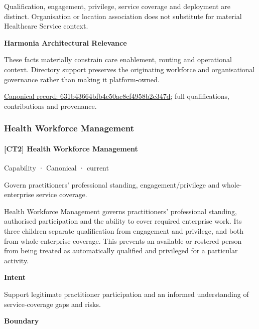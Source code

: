 Qualification, engagement, privilege, service coverage and deployment are distinct. Organisation or location association does not substitute for material Healthcare Service context.



\textbf{Harmonia Architectural Relevance}



These facts materially constrain care enablement, routing and operational context. Directory support preserves the originating workforce and organisational governance rather than making it platform-owned.


{\footnotesize \href{../../../../continuum/strategy/capability/631b43664bfb4c50ac8cf4958b2c347d.md}{Canonical record: 631b43664bfb4c50ac8cf4958b2c347d}; full qualifications, contributions and provenance.}\par
\subsubsection{Health Workforce Management}

\paragraph{[CT2] Health Workforce Management}

\label{element:7ec329cdc070472eb68966345d82031a}
{\small Capability · Canonical · current}\par

Govern practitioners’ professional standing, engagement/privilege and whole-enterprise service coverage.



Health Workforce Management governs practitioners' professional standing, authorised participation and the ability to cover required enterprise work. Its three children separate qualification from engagement and privilege, and both from whole-enterprise coverage. This prevents an available or rostered person from being treated as automatically qualified and privileged for a particular activity.



\textbf{Intent}



Support legitimate practitioner participation and an informed understanding of service-coverage gaps and risks.



\textbf{Boundary}



